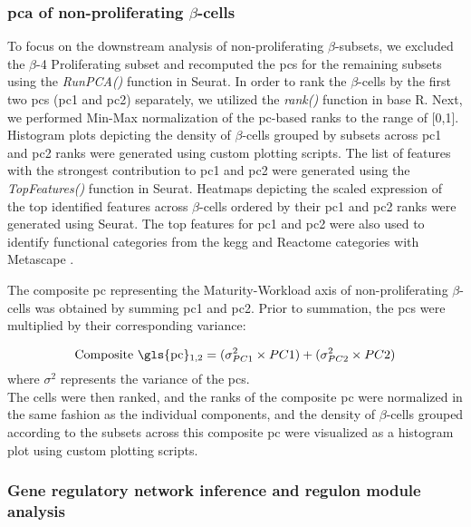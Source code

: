 \subsubsection{\large \gls{pca} of non-proliferating $\beta$-cells}
\label{subsubsec:met_chp3_pca}
\par To focus on the downstream analysis of non-proliferating $\beta$-subsets, we excluded the $\beta$-4 Proliferating subset and recomputed the \glspl{pc} for the remaining subsets using the \textit{RunPCA()} function in Seurat. In order to rank the $\beta$-cells by the first two \glspl{pc} (\gls{pc}1 and \gls{pc}2) separately, we utilized the \textit{rank()} function in base R. Next, we performed Min-Max normalization of the \gls{pc}-based ranks to the range of [0,1]. Histogram plots depicting the density of $\beta$-cells grouped by subsets across \gls{pc}1 and \gls{pc}2 ranks were generated using custom plotting scripts. The list of features with the strongest contribution to  \gls{pc}1 and \gls{pc}2 were generated using the \textit{TopFeatures()} function in Seurat. Heatmaps depicting the scaled expression of the top identified features across $\beta$-cells ordered by their \gls{pc}1 and \gls{pc}2 ranks were generated using Seurat. The top features for \gls{pc}1 and \gls{pc}2 were also used to identify functional categories from the \gls{kegg} and Reactome categories with Metascape \textbf{\cite{zhou_metascape_2019}}.\\

\par The composite \gls{pc} representing the Maturity-Workload axis of non-proliferating $\beta$-cells was obtained by summing \gls{pc}1 and \gls{pc}2. Prior to summation, the \glspl{pc} were multiplied by their corresponding variance:

\begin{equation}
    \text{Composite \gls{pc}\textsubscript{1,2}} = (\sigma^2_{PC1} \times PC1) + (\sigma^2_{PC2} \times PC2)
\end{equation}
where $\sigma^2$ represents the variance of the \glspl{pc}.\\

The cells were then ranked, and the ranks of the composite \gls{pc} were normalized in the same fashion as the individual components, and the density of $\beta$-cells grouped according to the subsets across this composite \gls{pc} were visualized as a histogram plot using custom plotting scripts. 

\subsubsection{\large Gene regulatory network inference and regulon module analysis}
\label{subsubsec:met_chp3_scenic}

